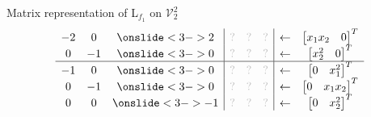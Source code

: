 \documentclass[10pt,T]{beamer}
\newcommand{\transparent}[1]{\textcolor{lightgray}{#1}}
\begin{document}
\begin{frame}[b]{Matrix representation of L$_{f_1}$ on $\mathcal{V}_2^2$}
\begin{equation*}
\begin{array}{ccc|ccc|cc}
    -2&0&\onslide<3->{2}&\transparent{?}&\transparent{?}&\transparent{?}&\leftarrow&\begin{bmatrix}x_1x_2&0\end{bmatrix}^T\\
    0&-1&\onslide<3->{0}&\transparent{?}&\transparent{?}&\transparent{?}&\leftarrow&\begin{bmatrix}x_2^2&0\end{bmatrix}^T\\\hline
    -1&0&\onslide<3->{0}&\transparent{?}&\transparent{?}&\transparent{?}&\leftarrow&\begin{bmatrix}0&x_1^2\end{bmatrix}^T\\
    0&-1&\onslide<3->{0}&\transparent{?}&\transparent{?}&\transparent{?}&\leftarrow&\begin{bmatrix}0&x_1x_2\end{bmatrix}^T\\
    0&0&\onslide<3->{-1}&\transparent{?}&\transparent{?}&\transparent{?}&\leftarrow&\begin{bmatrix}0&x_2^2\end{bmatrix}^T
    \end{array}
\end{equation*}
\end{frame}
\end{document}
